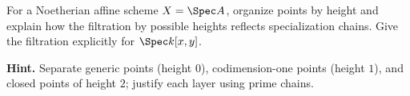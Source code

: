 \begin{problem}\label{chal:vi29-01}
For a Noetherian affine scheme $X=\Spec A$, organize points by height and explain how the filtration by possible heights reflects specialization chains.  Give the filtration explicitly for $\Spec k[x,y]$.

\textbf{Hint.} Separate generic points (height $0$), codimension-one points (height $1$), and closed points of height $2$; justify each layer using prime chains.
\end{problem}
